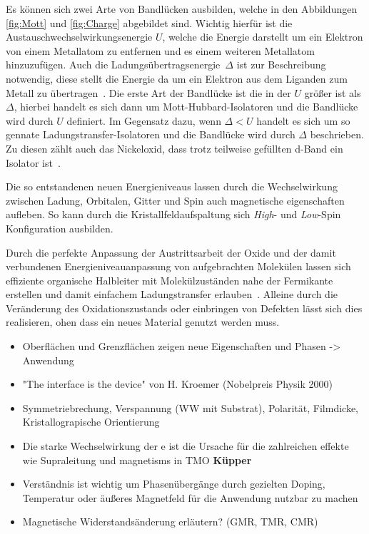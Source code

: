         Es können sich zwei Arte von Bandlücken ausbilden, welche in den Abbildungen \ref{fig:Mott} und \ref{fig:Charge} abgebildet sind.
        Wichtig hierfür ist die Austauschwechselwirkungsenergie $U$, welche die Energie darstellt um ein Elektron von einem Metallatom zu entfernen und es einem weiteren Metallatom hinzuzufügen.
        Auch die Ladungsübertragsenergie~$\Delta$ ist zur Beschreibung notwendig, diese stellt die Energie da um ein Elektron aus dem Liganden zum Metall zu übertragen~\cite{stohr_magnetism_2006}.
        Die erste Art der Bandlücke ist die in der $U$ größer ist als $\Delta$, hierbei handelt es sich dann um Mott-Hubbard-Isolatoren und die Bandlücke wird durch $U$ definiert.
        Im Gegensatz dazu, wenn $\Delta < U$ handelt es sich um so gennate Ladungstransfer-Isolatoren und die Bandlücke wird durch $\Delta$ beschrieben.
        Zu diesen zählt auch das Nickeloxid, dass trotz teilweise gefüllten d-Band ein Isolator ist~\cite{IF_5}.
        
        Die so entstandenen neuen Energieniveaus lassen durch die Wechselwirkung zwischen Ladung, Orbitalen, Gitter und Spin auch magnetische eigenschaften aufleben.
        So kann durch die Kristallfeldaufspaltung sich \textit{High}- und \textit{Low}-Spin Konfiguration ausbilden.

        Durch die perfekte Anpassung der Austrittsarbeit der Oxide und der damit verbundenen Energieniveauanpassung von aufgebrachten Molekülen lassen sich effiziente organische Halbleiter mit Molekülzuständen nahe der Fermikante erstellen und damit einfachem Ladungstransfer erlauben~\cite{IF_3}.
        Alleine durch die Veränderung des Oxidationszustands oder einbringen von Defekten lässt sich dies realisieren, ohen dass ein neues Material genutzt werden muss.

        \begin{itemize}
            \item Oberflächen und Grenzflächen zeigen neue Eigenschaften und Phasen -> Anwendung 
            \item "The interface is the device" von H. Kroemer (Nobelpreis Physik 2000)
            \item Symmetriebrechung, Verspannung (WW mit Substrat), Polarität, Filmdicke, Kristallograpische Orientierung
            \item Die starke Wechselwirkung der e ist die Ursache für die zahlreichen effekte wie Supraleitung und magnetisms in TMO \textbf{Küpper}
            \item Verständnis ist wichtig um Phasenübergänge durch gezielten Doping, Temperatur oder äußeres Magnetfeld für die Anwendung nutzbar zu machen
            \item Magnetische Widerstandsänderung erläutern? (GMR, TMR, CMR)
        \end{itemize}


